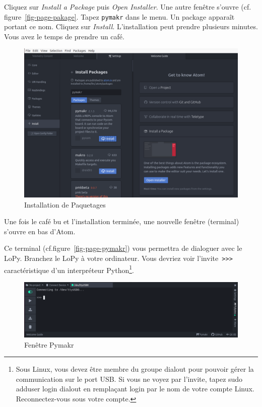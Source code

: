 Cliquez sur \textit{Install a Package} puis \textit{Open Installer}. Une autre fenêtre s’ouvre (cf. figure~\vref{fig-page-pakage}. Tapez \texttt{pymakr} dans le menu. Un package apparaît portant ce nom. Cliquez sur \textit{Install}. L’installation peut prendre plusieurs minutes. Vous avez le temps de prendre un café.

\begin{figure}[tbp]
\centerline{\includegraphics[width=1\columnwidth]{Pictures/atom_pymakr.png}}
\caption{Installation de Paquetages}
\label{fig-page-pakage}
\end{figure}

     \vspace{1em}

Une fois le café bu et l’installation terminée, une nouvelle fenêtre (terminal) s’ouvre en bas d’Atom.

     \vspace{1em}

Ce terminal (cf.figure~\vref{fig-page-pymakr}) vous permettra de dialoguer avec le LoPy. Branchez le LoPy à votre ordinateur. Vous devriez voir l’invite\texttt{ >{}>{}>{}} caractéristique d’un interpréteur Python\footnote{Sous Linux, vous devez être membre du groupe dialout pour pouvoir gérer la communication sur le port USB. Si vous ne voyez par l’invite, tapez sudo adduser login dialout en remplaçant login par le nom de votre compte Linux. Reconnectez-vous sous votre compte.}.

     \vspace{1em}

\begin{figure}[tbp]
\centerline{\includegraphics[width=1\columnwidth]{Pictures/atom_pymakr1.png}}
\caption{Fenêtre Pymakr}
\label{fig-page-pymakr}
\end{figure}

